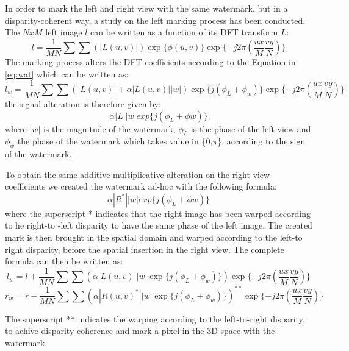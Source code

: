 In order to mark the left and right view with the same watermark, but in a disparity-coherent way, a study on the left marking process has been conducted.\\
The $NxM$ left image $l$ can be written as a function of its DFT transform $L$:
$$ l =  \frac{1}{MN}\sum\sum(|L(u,v)|)\exp\{\phi (u,v)\} \exp\{-j2\pi(\frac{ux}{M}\frac{vy}{N})\}  $$
The marking process alters the DFT coefficients according to the Equation in \ref{eq:wat}
which can be written as:
$$ l_{w} = \frac{1}{MN}\sum\sum(|L(u,v)| + \alpha|L(u,v)||w|)\exp\{j(\phi_{L}+\phi_{w})\}\exp\{-j2\pi(\frac{ux}{M}\frac{vy}{N})\} $$
the signal alteration is therefore given by:
$$ \alpha|L||w|exp\{j(\phi_{L}+\phi{w})\} $$ 
where $|w|$ is the magnitude of the watermark, $\phi_{L}$ is the phase of the left view and $ \phi_{w}$ the phase of the watermark which takes value in \{0,$\pi$\}, according to the sign of the watermark.


To obtain the same additive multiplicative alteration on the right view coefficients we created the watermark ad-hoc with the following formula: 
$$ \alpha|R^{*}||w|exp\{j(\phi_{L}+\phi{w})\} $$ 
where the superscript * indicates that the right image has been warped according to he right-to -left disparity to have the same phase of the left image.
The created mark is then brought in the spatial domain and warped according to the left-to right disparity, before the spatial insertion in the right view.
The complete formula can then be written as: 
$$ l_{w} = l + \frac{1}{MN}\sum\sum(\alpha|L(u,v)||w|\exp\{j(\phi_{L}+\phi_{w})\})\exp\{-j2\pi(\frac{ux}{M}\frac{vy}{N})\} $$
$$ r_{w} = r + \frac{1}{MN}\sum\sum(\alpha|R(u,v)^{*}||w|\exp\{j(\phi_{L}+\phi_{w})\})^{**}\exp\{-j2\pi(\frac{ux}{M}\frac{vy}{N})\} $$

The superscript ** indicates the warping according to the left-to-right disparity, to achive disparity-coherence and mark a pixel in the 3D space with the watermark.


